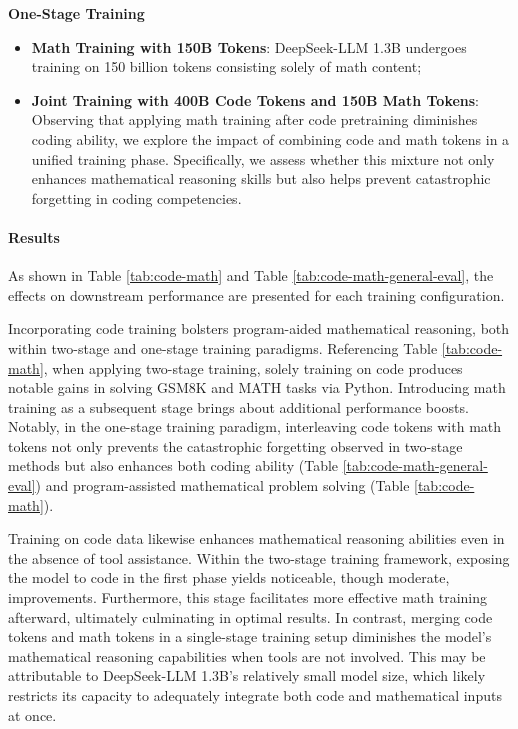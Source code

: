 \textbf{One-Stage Training}

\begin{itemize}[topsep=0pt]
    \item \textbf{Math Training with 150B Tokens}: DeepSeek-LLM 1.3B undergoes training on 150 billion tokens consisting solely of math content;
    \item \textbf{Joint Training with 400B Code Tokens and 150B Math Tokens}: Observing that applying math training after code pretraining diminishes coding ability, we explore the impact of combining code and math tokens in a unified training phase. Specifically, we assess whether this mixture not only enhances mathematical reasoning skills but also helps prevent catastrophic forgetting in coding competencies.
\end{itemize}

\paragraph{Results}
As shown in Table \ref{tab:code-math} and Table \ref{tab:code-math-general-eval}, the effects on downstream performance are presented for each training configuration.

Incorporating code training bolsters program-aided mathematical reasoning, both within two-stage and one-stage training paradigms. Referencing Table \ref{tab:code-math}, when applying two-stage training, solely training on code produces notable gains in solving GSM8K and MATH tasks via Python. Introducing math training as a subsequent stage brings about additional performance boosts. Notably, in the one-stage training paradigm, interleaving code tokens with math tokens not only prevents the catastrophic forgetting observed in two-stage methods but also enhances both coding ability (Table \ref{tab:code-math-general-eval}) and program-assisted mathematical problem solving (Table \ref{tab:code-math}).

Training on code data likewise enhances mathematical reasoning abilities even in the absence of tool assistance. Within the two-stage training framework, exposing the model to code in the first phase yields noticeable, though moderate, improvements. Furthermore, this stage facilitates more effective math training afterward, ultimately culminating in optimal results. In contrast, merging code tokens and math tokens in a single-stage training setup diminishes the model's mathematical reasoning capabilities when tools are not involved. This may be attributable to DeepSeek-LLM 1.3B's relatively small model size, which likely restricts its capacity to adequately integrate both code and mathematical inputs at once.

